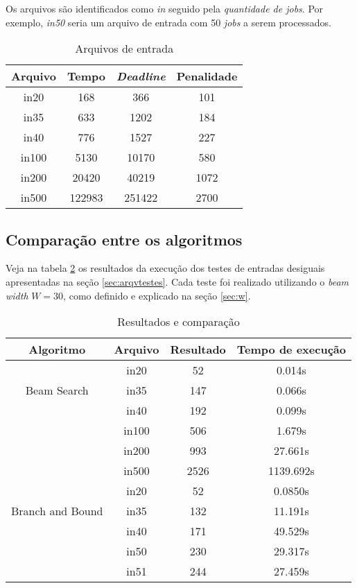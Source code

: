 \documentclass[
	11pt,				%
	oneside,			%
	a4paper,			%
	english,			%
	brazil,				%
	]{article}
\begin{document}
Os arquivos são identificados como \textit{in} seguido pela \textit{quantidade de jobs}. Por exemplo, \textit{in50} seria um arquivo de entrada com 50 \textit{jobs} a serem processados.

\begin{table}[ht]
\centering
\begin{tabular}{cccc}
\hline 
\textbf{Arquivo} & \textbf{Tempo} & \textbf{\textit{Deadline}} & \textbf{Penalidade} \\      
\hline
in20  & 168    & 366    & 101  \\
in35  & 633    & 1202   & 184  \\ 
in40  & 776    & 1527   & 227  \\
in100 & 5130   & 10170  & 580  \\
in200 & 20420  & 40219  & 1072 \\
in500 & 122983 & 251422 & 2700 \\
\hline
\end{tabular}
\caption{Arquivos de entrada}
\label{tab:ins}
\end{table}

\subsection{Comparação entre os algoritmos}
\label{sec:comp}
Veja na tabela \ref{tab:results} os resultados da execução dos testes de entradas desiguais apresentadas na seção \ref{sec:arqvtestes}. Cada teste foi realizado utilizando o \textit{beam width} $W = 30$, como definido e explicado na seção \ref{sec:w}.

\begin{table}[ht]
\centering
\begin{tabular}{cccc}
\hline 
\textbf{Algoritmo} & \textbf{Arquivo} & \textbf{Resultado} & \textbf{Tempo de execução} \\
\hline
\multirow{3}{*}{Beam Search} &
  in20  & 52   & 0.014s    \\ 
& in35  & 147  & 0.066s    \\ 
& in40  & 192  & 0.099s    \\
& in100 & 506  & 1.679s    \\
& in200 & 993  & 27.661s   \\
& in500 & 2526 & 1139.692s \\
\hline
\multirow{3}{*}{Branch and Bound} &
  in20 & 52  & 0.0850s \\ 
& in35 & 132 & 11.191s \\ 
& in40 & 171 & 49.529s \\
& in50 & 230 & 29.317s \\
& in51 & 244 & 27.459s \\
\hline
\end{tabular}
\caption{Resultados e comparação}
\label{tab:results}
\end{table}
\end{document}
